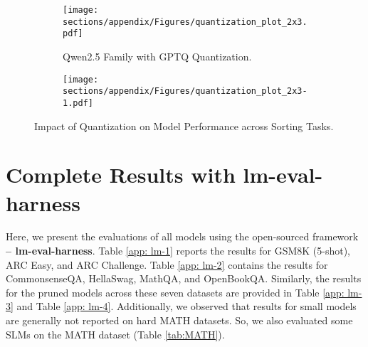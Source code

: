 \begin{figure*}
    \centering
    \begin{subfigure}[b]{1\linewidth}
        \texttt{[image: sections/appendix/Figures/quantization\_plot\_2x3.pdf]}
        \caption{Qwen2.5 Family with GPTQ Quantization.}
    \end{subfigure}
    
    \vspace{0.5cm} %

    \begin{subfigure}[b]{1\linewidth}
        \texttt{[image: sections/appendix/Figures/quantization\_plot\_2x3-1.pdf]}
    \end{subfigure}
    
    \caption{Impact of Quantization on Model Performance across Sorting Tasks.}
    \label{fig:app3}
\end{figure*}









\newpage




\section{Complete Results with lm-eval-harness}
\label{app: Results with lm-eval-harness}

Here, we present the evaluations of all models using the open-sourced framework \textbf{-- lm-eval-harness}. Table \ref{app: lm-1} reports the results for GSM8K (5-shot), ARC Easy, and ARC Challenge. Table \ref{app: lm-2} contains the results for CommonsenseQA, HellaSwag, MathQA, and OpenBookQA. Similarly, the results for the pruned models across these seven datasets are provided in Table \ref{app: lm-3} and Table \ref{app: lm-4}. Additionally, we observed that results for small models are generally not reported on hard MATH datasets. So, we also evaluated some SLMs on the MATH dataset (Table \ref{tab:MATH}). 

